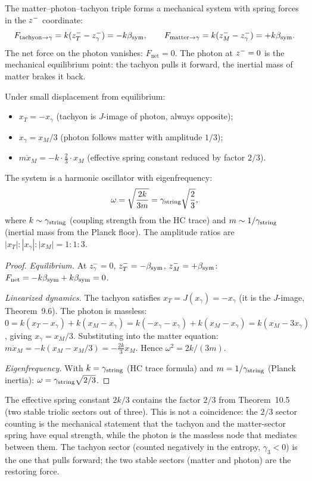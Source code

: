 \begin{theorem}
\label{thm:spring}
The matter--photon--tachyon triple forms a mechanical system with spring
forces in the $z^-$ coordinate:
\[
  F_{\mathrm{tachyon}\to\gamma} = k(z^-_T-z^-_\gamma) = -k\beta_{\mathrm{sym}},
  \qquad
  F_{\mathrm{matter}\to\gamma} = k(z^-_M-z^-_\gamma) = +k\beta_{\mathrm{sym}}.
\]
The net force on the photon vanishes: $F_{\mathrm{net}}=0$.
The photon at $z^-=0$ is the mechanical equilibrium point: the
tachyon pulls it forward, the inertial mass of matter brakes it back.

Under small displacement from equilibrium:
\begin{itemize}
  \item $x_T=-x_\gamma$ (tachyon is $J$-image of photon, always opposite);
  \item $x_\gamma=x_M/3$ (photon follows matter with amplitude $1/3$);
  \item $m\ddot x_M=-k\cdot\tfrac{2}{3}\cdot x_M$ (effective spring
        constant reduced by factor $2/3$).
\end{itemize}
The system is a harmonic oscillator with eigenfrequency:
\[
  \omega = \sqrt{\frac{2k}{3m}} = \gamma_{\mathrm{string}}\sqrt{\frac{2}{3}},
\]
where $k\sim\gamma_{\mathrm{string}}$ (coupling strength from the HC trace) and
$m\sim 1/\gamma_{\mathrm{string}}$ (inertial mass from the Planck floor).
The amplitude ratios are $|x_T|:|x_\gamma|:|x_M|=1:1:3$.
\begin{proof}
\emph{Equilibrium.}
At $z^-_\gamma=0$, $z^-_T=-\beta_{\mathrm{sym}}$, $z^-_M=+\beta_{\mathrm{sym}}$:
$F_{\mathrm{net}}=-k\beta_{\mathrm{sym}}+k\beta_{\mathrm{sym}}=0$.

\emph{Linearized dynamics.}
The tachyon satisfies $x_T=J(x_\gamma)=-x_\gamma$ (it is the $J$-image,
Theorem~9.6).
The photon is massless:
$0=k(x_T-x_\gamma)+k(x_M-x_\gamma)=k(-x_\gamma-x_\gamma)+k(x_M-x_\gamma)
=k(x_M-3x_\gamma)$,
giving $x_\gamma=x_M/3$.
Substituting into the matter equation:
$m\ddot x_M=-k(x_M-x_M/3)=-\tfrac{2k}{3}x_M$.
Hence $\omega^2=2k/(3m)$.

\emph{Eigenfrequency.}
With $k=\gamma_{\mathrm{string}}$ (HC trace formula) and $m=1/\gamma_{\mathrm{string}}$
(Planck inertia): $\omega=\gamma_{\mathrm{string}}\sqrt{2/3}$.
\end{proof}
\end{theorem}

\begin{remark}
The effective spring constant $2k/3$ contains the factor $2/3$ from
Theorem~10.5 (two stable triolic sectors out of three).
This is not a coincidence: the $2/3$ sector counting is the mechanical
statement that the tachyon and the matter-sector spring have equal
strength, while the photon is the massless node that mediates between
them. The tachyon sector (counted negatively in the entropy,
$\gamma_3<0$) is the one that pulls forward; the two stable sectors
(matter and photon) are the restoring force.
\end{remark}

